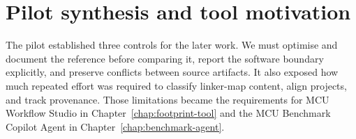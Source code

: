 \section{Pilot synthesis and tool motivation}
\label{sec:cascade-pilot-synthesis}

The pilot established three controls for the later work. We must optimise and document the
reference before comparing it, report the software boundary explicitly, and preserve
conflicts between source artifacts. It also exposed how much repeated effort was required
to classify linker-map content, align projects, and track provenance. Those limitations
became the requirements for MCU Workflow Studio in Chapter~\ref{chap:footprint-tool} and
the MCU Benchmark Copilot Agent in Chapter~\ref{chap:benchmark-agent}.
